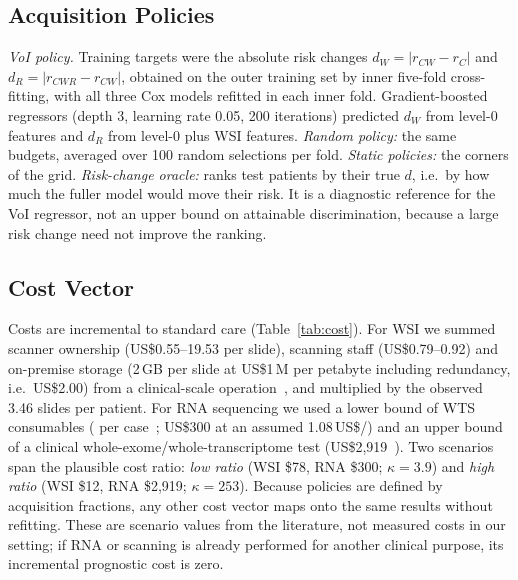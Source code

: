 \documentclass[journal,twoside,web]{IEEEtran}
\begin{document}
\subsection{Acquisition Policies}
\textit{VoI policy.} Training targets were the absolute risk changes $d_W = |r_{CW} - r_C|$ and $d_R = |r_{CWR} - r_{CW}|$, obtained on the outer training set by inner five-fold cross-fitting, with all three Cox models refitted in each inner fold. Gradient-boosted regressors (depth 3, learning rate 0.05, 200 iterations) predicted $d_W$ from level-0 features and $d_R$ from level-0 plus WSI features. \textit{Random policy:} the same budgets, averaged over 100 random selections per fold. \textit{Static policies:} the corners of the grid. \textit{Risk-change oracle:} ranks test patients by their true $d$, i.e.\ by how much the fuller model would move their risk. It is a diagnostic reference for the VoI regressor, not an upper bound on attainable discrimination, because a large risk change need not improve the ranking.

\subsection{Cost Vector}
Costs are incremental to standard care (Table~\ref{tab:cost}). For WSI we summed scanner ownership (US\$0.55--19.53 per slide), scanning staff (US\$0.79--0.92) and on-premise storage (2\,GB per slide at US\$1\,M per petabyte including redundancy, i.e.\ US\$2.00) from a clinical-scale operation~\cite{ardon2023}, and multiplied by the observed 3.46 slides per patient. For RNA sequencing we used a lower bound of WTS consumables ( per case~\cite{altburger2026}; US\$300 at an assumed 1.08\,US\$/\texteuro) and an upper bound of a clinical whole-exome/whole-transcriptome test (US\$2,919~\cite{ortendahl2025}). Two scenarios span the plausible cost ratio: \emph{low ratio} (WSI \$78, RNA \$300; $\kappa = 3.9$) and \emph{high ratio} (WSI \$12, RNA \$2,919; $\kappa = 253$). Because policies are defined by acquisition fractions, any other cost vector maps onto the same results without refitting. These are scenario values from the literature, not measured costs in our setting; if RNA or scanning is already performed for another clinical purpose, its incremental prognostic cost is zero.
\end{document}
